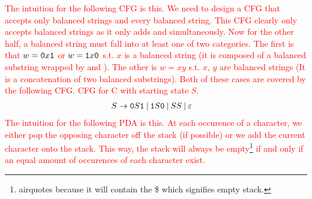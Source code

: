 \textcolor{red}{
    The intuition for the following CFG is this. We need to design a CFG that accepts only balanced strings and every balanced string. This CFG clearly only accepts balanced strings as it only adds  and  simultaneously. 
    Now for the other half, a balanced string must fall into at least one of two categories. 
    The first is that $w=\texttt{0}x\texttt{1}$ or $w=\texttt{1}x\texttt{0}$ s.t. $x$ is a balanced string (it is composed of a balanced substring wrapped by  and ). 
    The other is $w=xy$ s.t. $x$, $y$ are balanced strings (It is a concatenation of two balanced substrings).
    Both of these cases are covered by the following CFG.\newp
    CFG for C with starting state $S$.
    \begin{align*}
    S &\rightarrow \texttt{0}S\texttt{1} \:|\: \texttt{1}S\texttt{0} \:|\: SS \:|\: \varepsilon
    \end{align*}
    The intuition for the following PDA is this. At each occurence of a character, we either pop the opposing character off the stack (if possible) or we add the current character onto the stack. This way, the stack will always be empty\footnote{airquotes because it will contain the \$ which signifies empty stack.} if and only if an equal amount of occurences of each character exist.\newp
    \begin{figure}[h]
    \centering
    \end{figure}
}